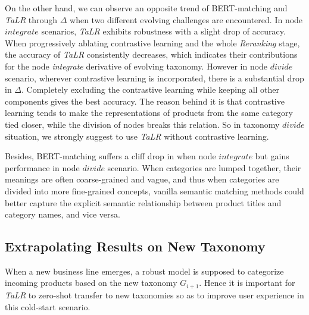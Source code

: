 On the other hand, we can observe an opposite trend of BERT-matching and \textit{TaLR} through $\Delta$ when two different evolving challenges are encountered. In node $integrate$ scenarios, \textit{TaLR} exhibits robustness with a slight drop of accuracy. 
When progressively ablating contrastive learning and the whole \textit{Reranking} stage, the accuracy of \textit{TaLR} consistently decreases, which indicates their contributions for the node \textit{integrate} derivative of evolving taxonomy.
However in node $divide$ scenario, wherever contrastive learning is incorporated, there is a substantial drop in $\Delta$. Completely excluding the contrastive learning while keeping all other components gives the best accuracy. 
The reason behind it is that contrastive learning tends to make the representations of products from the same category tied closer, while the division of nodes breaks this relation. So in taxonomy $divide$ situation, we strongly suggest to use \textit{TaLR} without contrastive learning.

Besides, BERT-matching suffers a cliff drop in when node $integrate$ but gains performance in node $divide$ scenario. When categories are lumped together, their meanings are often coarse-grained and vague, and thus when categories are divided into more fine-grained concepts, vanilla semantic matching methods could better capture the explicit semantic relationship between product titles and category names, and vice versa.



\subsection{Extrapolating Results on New Taxonomy}
\label{sec:new tax}
When a new business line emerges, a robust model is supposed to categorize incoming products based on the new taxonomy $G_{i+1}$. Hence it is important for \textit{TaLR} to zero-shot transfer to new taxonomies so as to improve user experience in this cold-start scenario.

